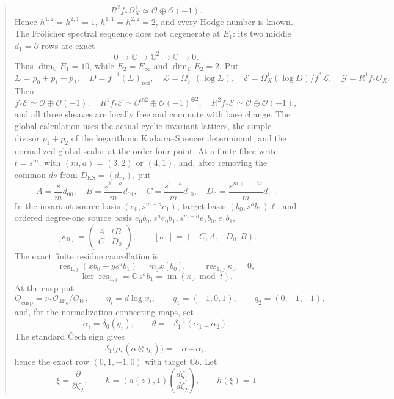 \documentclass[11pt,letterpaper]{article}
\theoremstyle{definition}
\theoremstyle{remark}
\begin{document}
\begin{abstract}
\[R^2f_*\Omega_X^1\simeq\mathcal O\oplus\mathcal O(-1).
\]
Hence $h^{1,2}=h^{2,1}=1$, $h^{1,1}=h^{2,2}=2$, and every Hodge number is
known.  The Fr\"olicher spectral sequence does not degenerate at $E_1$: its
two middle $d_1=\partial$ rows are exact
\[
0\longrightarrow\mathbb C\longrightarrow\mathbb C^2
\longrightarrow\mathbb C\longrightarrow0.
\]
Thus $\dim_{\mathbb C}E_1=10$, while
$E_2=E_\infty$ and $\dim_{\mathbb C}E_2=2$.
Put
\[
 \Sigma=p_0+p_1+p_2,\quad D=f^{-1}(\Sigma)_{\mathrm{red}},\quad
 \mathcal L=\Omega^1_{\mathbb P^1}(\log\Sigma),\quad
 \mathcal E=\Omega_X^1(\log D)/f^*\mathcal L,
 \quad \mathcal G=R^1f_*\mathcal O_X.
\]
Then
\[
 f_*\mathcal E\simeq\mathcal O\oplus\mathcal O(-1),\quad
 R^1f_*\mathcal E\simeq\mathcal O^{\oplus2}\oplus
 \mathcal O(-1)^{\oplus2},\quad
 R^2f_*\mathcal E\simeq\mathcal O\oplus\mathcal O(-1),
\]
and all three sheaves are locally free and commute with base change.  The
global calculation uses the actual cyclic invariant lattices, the simple divisor
  $p_1+p_2$ of the logarithmic Kodaira--Spencer determinant, and the normalized
  global scalar at the order-four point.  At a finite fibre write \(t=s^m\),
  with \((m,a)=(3,2)\) or \((4,1)\), and, after removing the common \(ds\)
  from \(D_{\mathrm{KS}}=(d_{rs})\), put
 \[
 A=\frac{s}{m}d_{00},\quad B=\frac{s^{1-a}}m d_{01},\quad
 C=\frac{s^{1-a}}m d_{10},\quad D_0=\frac{s^{m+1-2a}}m d_{11}.
 \]
  In the invariant source basis \((e_0,s^{m-a}e_1)\), target basis
  \((b_0,s^ab_1)\ell\), and ordered degree-one source basis
  \(e_0b_0,s^ae_0b_1,s^{m-a}e_1b_0,e_1b_1\),
 \[
  [\kappa_0]=\begin{pmatrix}A&tB\\ C&D_0\end{pmatrix},\qquad
  [\kappa_1]=(-C,A,-D_0,B).
 \]
 The exact finite residue cancellation is
 \[
  \operatorname{res}_{1,j}(xb_0+ys^ab_1)=m_jx[b_0],\qquad
  \operatorname{res}_{1,j}\kappa_0=0,
 \]
 \[
  \ker\operatorname{res}_{1,j}=\mathbb C\,s^ab_1
  =\operatorname{im}(\kappa_0\bmod t).
 \]
 At the cusp put
 \[
  Q_{\mathrm{cusp}}=\nu_*\mathcal O_{\mathrm{dP}_6}/\mathcal O_W,\qquad
  \eta_i=d\log x_i,\qquad q_1=(-1,0,1),\qquad q_2=(0,-1,-1),
 \]
 and, for the normalization connecting maps, set
 \[
  \alpha_i=\delta_0(q_i),\qquad
  \theta=-\delta_1^{-1}(\alpha_1\smile\alpha_2).
 \]
 The standard \v Cech sign gives
 \[
  \delta_1\bigl(\rho_*(\alpha\otimes\eta_i)\bigr)
  =-\alpha\smile\alpha_i,
 \]
 hence the exact row \((0,1,-1,0)\) with target \(\mathbb C\theta\).
 Let
 \[
  \xi=\frac{\partial}{\partial\zeta_2},\qquad
  h=(a(z),1)\binom{d\zeta_1}{d\zeta_2},\qquad h(\xi)=1
\]
\end{abstract}
\end{document}

